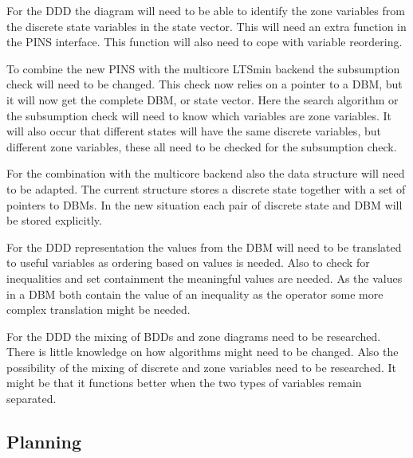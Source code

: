 \documentclass[11pt]{article}
\begin{document}
For the DDD the diagram will need to be able to identify the zone variables from the discrete state variables in the state vector. This will need an extra function in the PINS interface. This function will also need to cope with variable reordering. 

To combine the new PINS with the multicore LTSmin backend the subsumption check will need to be changed. This check now relies on a pointer to a DBM, but it will now get the complete DBM, or state vector. Here the search algorithm or the subsumption check will need to know which variables are zone variables. It will also occur that different states will have the same discrete variables, but different zone variables, these all need to be checked for the subsumption check.

For the combination with the multicore backend also the data structure will need to be adapted. The current structure stores a discrete state together with a set of pointers to DBMs. In the new situation each pair of discrete state and DBM will be stored explicitly.

For the DDD representation the values from the DBM will need to be translated to useful variables as ordering based on values is needed. Also to check for inequalities and set containment the meaningful values are needed. As the values in a DBM both contain the value of an inequality as the operator some more complex translation might be needed. 


For the DDD the mixing of BDDs and zone diagrams need to be researched. There is little knowledge on how algorithms might need to be changed. Also the possibility of the mixing of discrete and zone variables need to be researched. It might be that it functions better when the two types of variables remain separated.

\subsection{Planning}

{}

\end{document}
